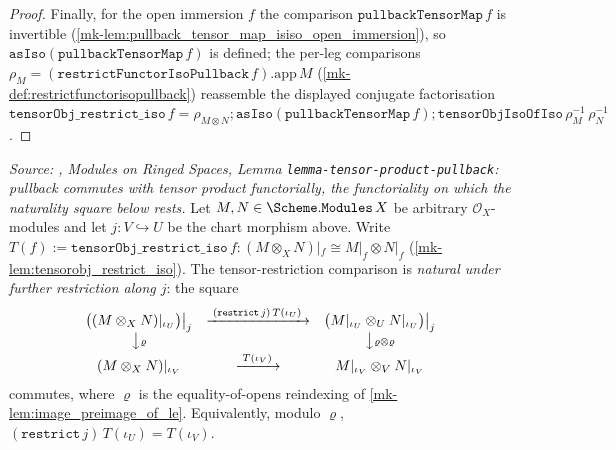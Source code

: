 \begin{proof}
  Finally, for the open immersion \(f\) the comparison \(\mathtt{pullbackTensorMap}\,f\) is
  invertible (\ref{mk-lem:pullback_tensor_map_isiso_open_immersion}), so
  \(\mathtt{asIso}(\mathtt{pullbackTensorMap}\,f)\) is defined; the per-leg comparisons
  \(\rho_M = (\mathtt{restrictFunctorIsoPullback}\,f).\mathrm{app}\,M\)
  (\ref{mk-def:restrictfunctorisopullback}) reassemble the displayed conjugate factorisation
  \(\mathtt{tensorObj\_restrict\_iso}\,f = \rho_{M \otimes N} \mathbin{;}
  \mathtt{asIso}(\mathtt{pullbackTensorMap}\,f) \mathbin{;}
  \mathtt{tensorObjIsoOfIso}\,\rho_M^{-1}\,\rho_N^{-1}\).
\end{proof}

\begin{lemma}\label{mk-lem:tensorobj_restrict_iso_restrict_compat}
  \leanok

  \textit{Source: \cite{stacks-project}, Modules on Ringed Spaces, Lemma
  \texttt{lemma-tensor-product-pullback}: pullback commutes with tensor product
  \emph{functorially}, the functoriality on which the naturality square below rests.}
  Let \(M, N \in \Scheme.\mathtt{Modules}\,X\) be arbitrary \(\mathcal{O}_X\)-modules and let
  \(j : V \hookrightarrow U\) be the chart morphism above. Write
  \(T(f) := \mathtt{tensorObj\_restrict\_iso}\,f : (M \otimes_X N)|_f \cong M|_f \otimes N|_f\)
  (\ref{mk-lem:tensorobj_restrict_iso}). The tensor-restriction comparison is \emph{natural under
  further restriction along \(j\)}: the square
  \[
    \begin{array}{ccc}
      \bigl((M \otimes_X N)|_{\iota_U}\bigr)\big|_j
        & \xrightarrow{\;(\mathtt{restrict}\,j)\,T(\iota_U)\;}
        & \bigl(M|_{\iota_U} \otimes_U N|_{\iota_U}\bigr)\big|_j \\[2pt]
      \big\downarrow{\scriptstyle \varrho}
        & & \big\downarrow{\scriptstyle \varrho \otimes \varrho} \\[2pt]
      (M \otimes_X N)|_{\iota_V}
        & \xrightarrow{\;T(\iota_V)\;}
        & M|_{\iota_V} \otimes_V N|_{\iota_V}
    \end{array}
  \]
  commutes, where \(\varrho\) is the equality-of-opens reindexing of
  \ref{mk-lem:image_preimage_of_le}. Equivalently, modulo \(\varrho\),
  \((\mathtt{restrict}\,j)\,T(\iota_U) = T(\iota_V)\).
\end{lemma}

